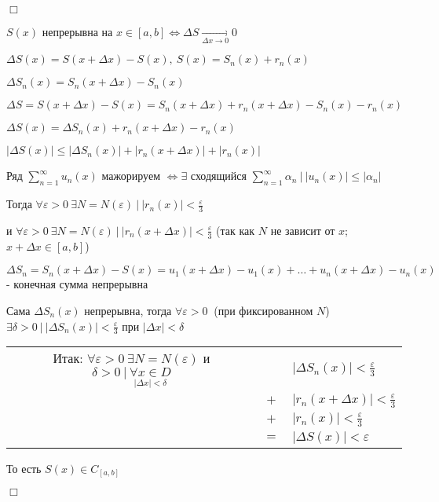 \documentclass[12pt]{article}
\begin{document}
    \begin{MyProof}
        $\Box$

        $S(x)$ непрерывна на $x \in [a, b] \Longleftrightarrow \Delta S \underset{\Delta x \to 0}{\rightarrow} 0$

        $\Delta S(x) = S(x + \Delta x) - S(x), \ S(x) = S_n(x) + r_n(x)$

        $\Delta S_n(x) = S_n(x + \Delta x) - S_n(x)$

        $\Delta S = S(x + \Delta x) - S(x) = S_n(x + \Delta x) + r_n(x +  \Delta x) - S_n(x) - r_n(x)$

        $\Delta S(x) = \Delta S_n(x) + r_n(x + \Delta x) - r_n(x)$

        $|\Delta S(x)| \leq |\Delta S_n(x)| + |r_n(x + \Delta x)| + |r_n(x)|$

        Ряд $\sum_{n = 1}^\infty u_n(x)$ мажорируем $\Longleftrightarrow \exists$ сходящийся $\sum_{n = 1}^\infty \alpha_n \ \Big| \ |u_n(x)| \leq |\alpha_n|$
    
        Тогда $\forall \varepsilon > 0 \ \exists N = N(\varepsilon) \ | \ |r_n(x)| < \frac{\varepsilon}{3}$

        и $\forall \varepsilon > 0 \ \exists N = N(\varepsilon) \ | \ |r_n(x + \Delta x)| < \frac{\varepsilon}{3}$ (так как $N$ не зависит от $x$; $x + \Delta x \in [a, b]$) 
    
        $\Delta S_n = S_n(x + \Delta x) - S(x) = u_1(x + \Delta x) - u_1(x) + \dots + u_n(x + \Delta x) - u_n(x)$ - конечная сумма непрерывна

        Сама $\Delta S_n(x)$ непрерывна, тогда $\forall \varepsilon > 0 \ $ (при фиксированном $N$) $\exists \delta > 0 \ | \ |\Delta S_n(x)| < \frac{\varepsilon}{3}$ при $|\Delta x| < \delta$

        \bgroup
        \setlength\tabcolsep{1.5pt}
        \begin{tabular}{ccl}
            Итак: $\forall \varepsilon > 0 \ \exists N = N(\varepsilon)$ и $\delta > 0 \ | \ \underset{|\Delta x| < \delta}{\forall x \in D}$ & & $|\Delta S_n(x)| < \frac{\varepsilon}{3}$ \\
            
            & $+$ & $|r_n(x + \Delta x)| < \frac{\varepsilon}{3}$ \\ 
            
            & $+$ & $|r_n(x)| < \frac{\varepsilon}{3}$ \\

            & $=$ & $|\Delta S(x)| < \varepsilon$
        \end{tabular}
        \egroup

        То есть $S(x) \in C_{[a, b]}$

        $\Box$
    \end{MyProof}
\end{document}
